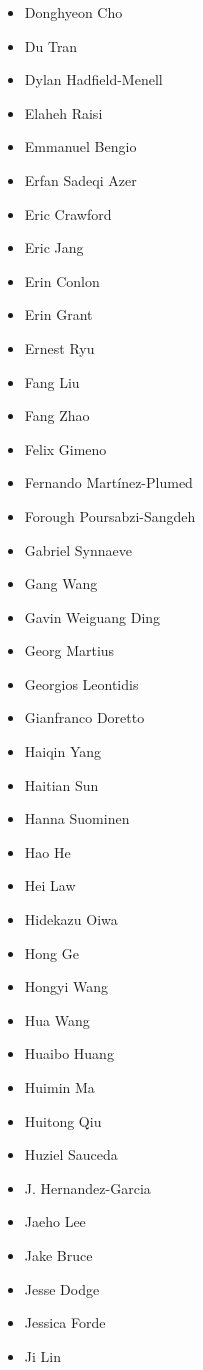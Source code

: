 \begin{multicols}{3}
\begin{itemize}[label={}]
    \item Donghyeon Cho
    \item Du Tran
    \item Dylan Hadfield-Menell
    \item Elaheh Raisi
    \item Emmanuel Bengio
    \item Erfan Sadeqi Azer
    \item Eric Crawford
    \item Eric Jang
    \item Erin Conlon
    \item Erin Grant
    \item Ernest Ryu
    \item Fang Liu
    \item Fang Zhao
    \item Felix Gimeno
    \item Fernando Martínez-Plumed
    \item Forough Poursabzi-Sangdeh
    \item Gabriel Synnaeve
    \item Gang Wang
    \item Gavin Weiguang Ding
    \item Georg Martius
    \item Georgios Leontidis
    \item Gianfranco Doretto
    \item Haiqin Yang
    \item Haitian Sun
    \item Hanna Suominen
    \item Hao He
    \item Hei Law
    \item Hidekazu Oiwa
    \item Hong Ge
    \item Hongyi Wang
    \item Hua Wang
    \item Huaibo Huang
    \item Huimin Ma
    \item Huitong Qiu
    \item Huziel Sauceda
    \item J. Hernandez-Garcia
    \item Jaeho Lee
    \item Jake Bruce
    \item Jesse Dodge
    \item Jessica Forde
    \item Ji Lin

\end{itemize}
\end{multicols}
